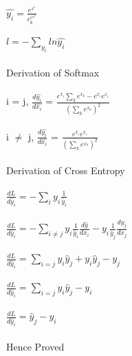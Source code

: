 \newcommand\tab[1][1cm]{\hspace*{#1}}
\begin{answer}
\\  \\
\tab $\widehat{y_i} = \frac{e^{x^i}}{\epsilon_k^{e^{x^k}}} $ \\ \\
\tab $l = - \sum_{y_i}ln\widehat{y_i}$ \\ \\
Derivation of Softmax \\ \\
i = j, $\frac{d\widehat{y_i}}{d\widehat{x_i}}$ = $\frac{e^{x_i} \sum_k e^{x_k} - e^{x_i}e^{x_i}} {(\sum_k e^{x_k})^2}$ \\ \\
i $\neq$ j, $\frac{d\widehat{y_i}}{d\widehat{x_i}}$ = $\frac{ e^{x_i}e^{x_i}} {(\sum_k e^{x_k})^2}$ \\ \\

Derivation of Cross Entropy \\ \\

\tab$\frac{dL}{d\widehat{y}_i} = - \sum_iy_i \frac{1}{\widehat{y}_i}$ \\ \\

\tab$\frac{dL}{d\widehat{y}_i} = - \sum_{i\neq j}y_i \frac{1}{\widehat{y}_i}\frac{d\widehat{y}}{dx_i} - y_i \frac{1}{\widehat{y}_j}\frac{dy_j}{dx_j}$ \\ \\

\tab$\frac{dL}{d\widehat{y}_i} =  \sum_{i=j}y_i\widehat{y}_j + y_i\widehat{y}_j  - y_j$ \\ \\

\tab$\frac{dL}{d\widehat{y}_i} =  \sum_{i=j}y_i\widehat{y}_j  - y_i$ \\ \\
\tab$\frac{dL}{d\widehat{y}_i} =  \widehat{y}_j  - y_i$ \\ \\
Hence Proved
\end{answer}
